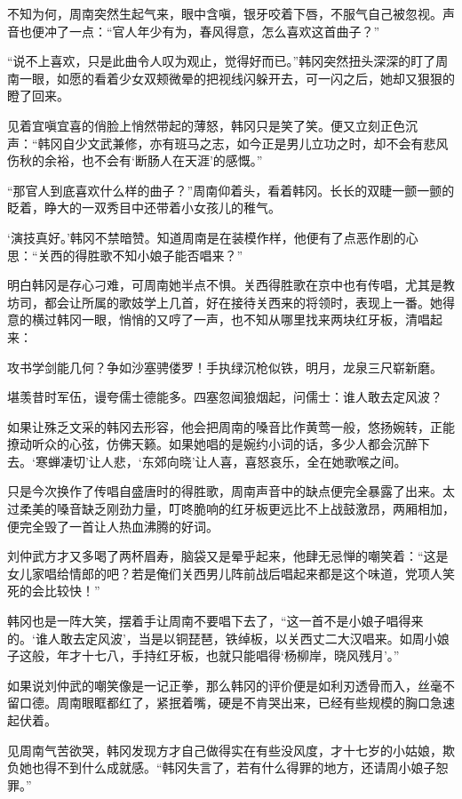 不知为何，周南突然生起气来，眼中含嗔，银牙咬着下唇，不服气自己被忽视。声音也便冲了一点：“官人年少有为，春风得意，怎么喜欢这首曲子？”

“说不上喜欢，只是此曲令人叹为观止，觉得好而已。”韩冈突然扭头深深的盯了周南一眼，如愿的看着少女双颊微晕的把视线闪躲开去，可一闪之后，她却又狠狠的瞪了回来。

见着宜嗔宜喜的俏脸上悄然带起的薄怒，韩冈只是笑了笑。便又立刻正色沉声：“韩冈自少文武兼修，亦有班马之志，如今正是男儿立功之时，却不会有悲风伤秋的余裕，也不会有‘断肠人在天涯’的感慨。”

“那官人到底喜欢什么样的曲子？”周南仰着头，看着韩冈。长长的双睫一颤一颤的眨着，睁大的一双秀目中还带着小女孩儿的稚气。

‘演技真好。’韩冈不禁暗赞。知道周南是在装模作样，他便有了点恶作剧的心思：“关西的得胜歌不知小娘子能否唱来？”

明白韩冈是存心刁难，可周南她半点不惧。关西得胜歌在京中也有传唱，尤其是教坊司，都会让所属的歌妓学上几首，好在接待关西来的将领时，表现上一番。她得意的横过韩冈一眼，悄悄的又哼了一声，也不知从哪里找来两块红牙板，清唱起来：

攻书学剑能几何？争如沙塞骋偻罗！手执绿沉枪似铁，明月，龙泉三尺崭新磨。

堪羡昔时军伍，谩夸儒士德能多。四塞忽闻狼烟起，问儒士：谁人敢去定风波？

如果让殊乏文采的韩冈去形容，他会把周南的嗓音比作黄莺一般，悠扬婉转，正能撩动听众的心弦，仿佛天籁。如果她唱的是婉约小词的话，多少人都会沉醉下去。‘寒蝉凄切’让人悲，‘东郊向晓’让人喜，喜怒哀乐，全在她歌喉之间。

只是今次换作了传唱自盛唐时的得胜歌，周南声音中的缺点便完全暴露了出来。太过柔美的嗓音缺乏刚劲力量，叮咚脆响的红牙板更远比不上战鼓激昂，两厢相加，便完全毁了一首让人热血沸腾的好词。

刘仲武方才又多喝了两杯眉寿，脑袋又是晕乎起来，他肆无忌惮的嘲笑着：“这是女儿家唱给情郎的吧？若是俺们关西男儿阵前战后唱起来都是这个味道，党项人笑死的会比较快！”

韩冈也是一阵大笑，摆着手让周南不要唱下去了，“这一首不是小娘子唱得来的。‘谁人敢去定风波’，当是以铜琵琶，铁绰板，以关西丈二大汉唱来。如周小娘子这般，年才十七八，手持红牙板，也就只能唱得‘杨柳岸，晓风残月’。”

如果说刘仲武的嘲笑像是一记正拳，那么韩冈的评价便是如利刃透骨而入，丝毫不留口德。周南眼眶都红了，紧抿着嘴，硬是不肯哭出来，已经有些规模的胸口急速起伏着。

见周南气苦欲哭，韩冈发现方才自己做得实在有些没风度，才十七岁的小姑娘，欺负她也得不到什么成就感。“韩冈失言了，若有什么得罪的地方，还请周小娘子恕罪。”

